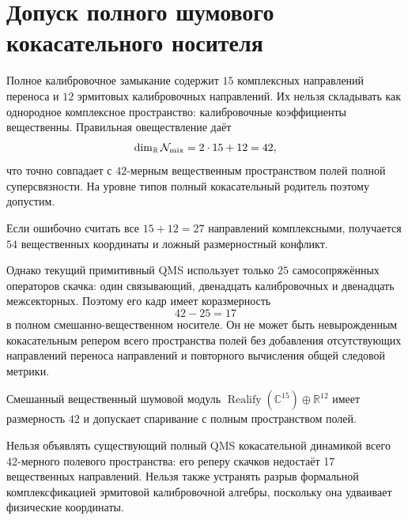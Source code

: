 \chapter{Допуск полного шумового кокасательного носителя}
\label{ch:v8-full-noise-cotangent-carrier-admission-gate}

Полное калибровочное замыкание содержит $15$ комплексных направлений переноса и
$12$ эрмитовых калибровочных направлений. Их нельзя складывать как однородное
комплексное пространство: калибровочные коэффициенты вещественны. Правильная
овеществление даёт
\begin{equation}
 \dim_{\mathbb R}\mathcal N_{\rm mix}=2\cdot15+12=42,
\end{equation}
что точно совпадает с $42$-мерным вещественным пространством полей полной
суперсвязности. На уровне типов полный кокасательный родитель поэтому допустим.

Если ошибочно считать все $15+12=27$ направлений комплексными, получается
$54$ вещественных координаты и ложный размерностный конфликт.

Однако текущий примитивный QMS использует только $25$ самосопряжённых
операторов скачка: один связывающий, двенадцать калибровочных и двенадцать межсекторных. Поэтому
его кадр имеет коразмерность
\begin{equation}
 42-25=17
\end{equation}
в полном смешанно-вещественном носителе. Он не может быть невырожденным
кокасательным репером всего пространства полей без добавления отсутствующих направлений переноса
направлений и повторного вычисления общей следовой метрики.

\begin{theorem}
Смешанный вещественный шумовой модуль
$\operatorname{Realify}(\mathbb C^{15})\oplus\mathbb R^{12}$ имеет
размерность $42$ и допускает спаривание с полным пространством полей.
\end{theorem}

\begin{nogocriterion}
Нельзя объявлять существующий полный QMS кокасательной динамикой всего
42-мерного полевого пространства: его реперу скачков недостаёт 17 вещественных
направлений. Нельзя также устранять разрыв формальной комплексфикацией
эрмитовой калибровочной алгебры, поскольку она удваивает физические координаты.
\end{nogocriterion}

